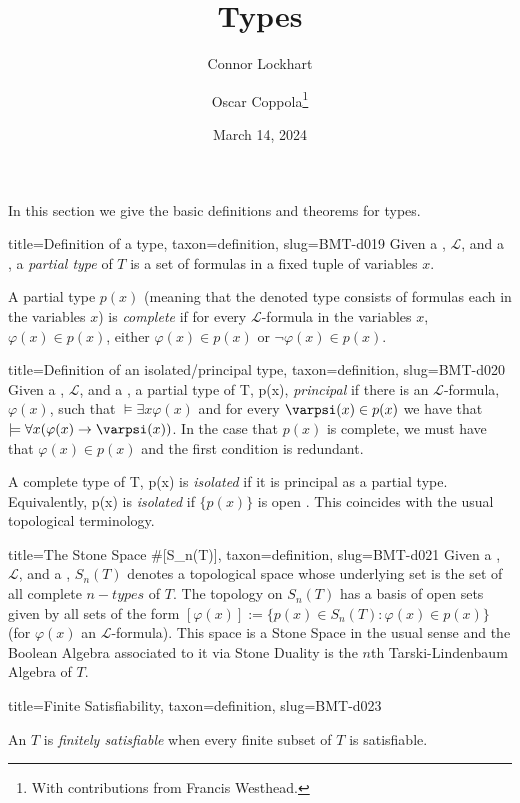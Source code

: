 \documentclass[a4paper]{article}
\title{Types}
\date{March 14, 2024}
\author{Connor Lockhart \and Oscar Coppola\thanks{With contributions from Francis Westhead.}}
\begin{document}
\maketitle
\par{In this section we give the basic definitions and theorems for types.}
\begin{tree}{title={Definition of a type}, taxon={definition}, slug={BMT-d019}}
Given a , \(\mathcal {L}\), and a , a \emph{partial type} of \(T\) is a  set of formulas in a fixed tuple of variables \(x\).\par{A partial type \(p(x)\) (meaning that the denoted type consists of formulas each in the variables \(x\)) is \emph{complete} if for every \(\mathcal {L}\)-formula in the variables \(x\), \(\varphi (x) \in  p(x)\), either \(\varphi (x) \in  p(x)\) or \(\neg   \varphi (x) \in  p(x)\).}
\end{tree}

\begin{tree}{title={Definition of an isolated/principal type}, taxon={definition}, slug={BMT-d020}}
Given a , \(\mathcal {L}\), and a , a partial type of T, {p(x)}, \emph{principal} if there is an \(\mathcal {L}\)-formula, \(\varphi (x)\), such that \(\models   \exists  x  \varphi (x)\) and for every \(\varpsi (x)  \in  p(x)\) we have that \(\models   \forall  x ( \varphi (x)  \rightarrow   \varpsi (x))\). In the case that \(p(x)\) is complete, we must have that \(\varphi (x) \in  p(x)\) and the first condition is redundant.\par{A complete type of T, {p(x)} is \emph{isolated} if it is principal as a partial type. Equivalently, {p(x)} is \emph{isolated} if \(\{ p(x) \}\) is open . This coincides with the usual topological terminology.}
\end{tree}

\begin{tree}{title={The Stone Space #[S_n(T)]}, taxon={definition}, slug={BMT-d021}}
Given a , \(\mathcal {L}\), and a ,
\(S_n(T)\) denotes a topological space whose underlying set is the set of all complete \(n-types\) of \(T\).
The topology on \(S_n(T)\) has a basis of open sets given by all sets of the form \([ \varphi (x)] :=  \{ p(x) \in  S_n(T):
 \varphi (x)  \in  p(x) \}\) (for \(\varphi (x)\) an \(\mathcal {L}\)-formula).
This space is a Stone Space in the usual sense and the Boolean Algebra associated to it via Stone Duality is
the \(n\)th Tarski-Lindenbaum Algebra of \(T\).
\end{tree}

\begin{tree}{title={Finite Satisfiability}, taxon={definition}, slug={BMT-d023}}

    An  \(T\) is \emph{finitely satisfiable} when every finite subset of \(T\) is satisfiable.

\end{tree}

\printbibliography
\end{document}
